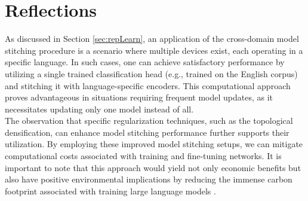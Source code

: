 \documentclass[../main.tex]{subfiles}
\begin{document}
\section{Reflections}
\label{sec:reflections}

As discussed in Section \ref{sec:repLearn}, an application of the cross-domain model stitching procedure is a scenario where multiple devices exist, each operating in a specific language. In such cases, one can achieve satisfactory performance by utilizing a single trained classification head (e.g., trained on the English corpus) and stitching it with language-specific encoders. This computational approach proves advantageous in situations requiring frequent model updates, as it necessitates updating only one model instead of all.\\

The observation that specific regularization techniques, such as the topological densification, can enhance model stitching performance further supports their utilization. By employing these improved model stitching setups, we can mitigate computational costs associated with training and fine-tuning networks. It is important to note that this approach would yield not only economic benefits but also have positive environmental implications by reducing the immense carbon footprint associated with training large language models \cite{strubell_energy_2019}.
\end{document}
